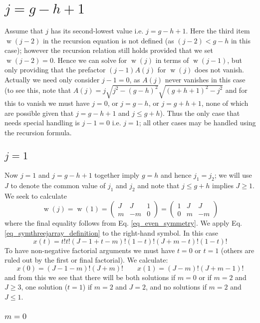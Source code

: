 \documentclass[11pt]{article}
\newcommand{\symthreejarray}[6]{{\left( \begin{array}{ccc} #1 & #2 & #3 \\ #4 & #5 & #6 \end{array} \right)} }
\DeclareMathOperator{\threej}{w}
\begin{document}
\section{$j = g-h+1$}

Assume that $j$ has its second-lowest value i.e. $j = g-h+1$. Here the third item $\threej(j-2)$ in the recursion equation is not defined (as $(j-2) < g-h$ in this case); however the recursion relation still holds provided that we set $\threej(j-2) = 0$. Hence we can solve for $\threej(j)$ in terms of $\threej(j-1)$, but only providing that the prefactor $(j-1)A(j)$ for $\threej(j)$ does not vanish. Actually we need only consider $j-1=0$, as $A(j)$ never vanishes in this case (to see this, note that $A(j) = j \sqrt{j^2 - (g-h)^2} \sqrt{(g+h+1)^2 - j^2}$ and for this to vanish we must have $j=0$, or $j = g-h$, or $j = g+h+1$, none of which are possible given that $j = g-h+1$ and $j \le g+h$). Thus the only case that needs special handling is $j-1=0$ i.e. $j=1$; all other cases may be handled using the recursion formula.

\subsection{$j=1$}

Now $j=1$ and $j=g-h+1$ together imply $g=h$ and hence $j_1 = j_2$; we will use $J$ to denote the common value of $j_1$ and $j_2$ and note that $j \le g+h$ implies $J \ge 1$. We seek to calculate
\begin{equation}
\threej(j) = \threej(1) = \symthreejarray{J}{J}{1}{m}{-m}{0} = \symthreejarray{1}{J}{J}{0}{m}{-m}
\end{equation}
where the final equality follows from Eq. \ref{eq_even_symmetry}. We apply Eq. \ref{eq_symthreejarray_definition} to the right-hand symbol. In this case
\begin{equation}
x(t) = t! t! (J-1+t-m)! (1-t)! (J+m-t)! (1-t)!
\end{equation}
To have non-negative factorial arguments we must have $t=0$ or $t=1$ (others are ruled out by the first or final factorial). We calculate:
\begin{equation}
x(0) = (J-1-m)!(J+m)! \qquad x(1) = (J-m)!(J+m-1)! 
\end{equation}
and from this we see that there will be both solutions if $m=0$ or if $m=2$ and $J \ge 3$, one solution ($t=1$) if $m=2$ and $J = 2$, and no solutions if $m=2$ and $J \le 1$.

\subsubsection{$m=0$}
\end{document}
